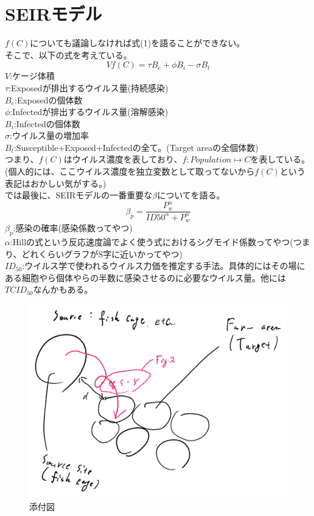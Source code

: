 \documentclass{article}
\begin{document}
\section{SEIRモデル}
$f(C)$についても議論しなければ式(1)を語ることができない。\\
そこで、以下の式を考えている。
\begin{equation}
    Vf(C) = \tau B_e + \phi B_i - \sigma B_t
\end{equation}
$V$:ケージ体積\\
$\tau$:Exposedが排出するウイルス量(持続感染)\\
$B_e$:Exposedの個体数\\
$\phi$:Infectedが排出するウイルス量(溶解感染)\\
$B_i$:Infectedの個体数\\
$\sigma$:ウイルス量の増加率\\
$B_t$:Susceptible+Exposed+Infectedの全て。(Target areaの全個体数)\\
つまり、$f(C)$はウイルス濃度を表しており、$f:Population\mapsto C$を表している。\\
(個人的には、ここウイルス濃度を独立変数として取ってないから$f(C)$という表記はおかしい気がする。)\\

では最後に、SEIRモデルの一番重要な$\beta$についてを語る。\\
\begin{equation}
    \beta _p = \frac{P^\alpha _w}{ID50^\alpha + P^\alpha _w}
\end{equation}
$\beta _p$:感染の確率(感染係数ってやつ)\\
$\alpha$:Hillの式という反応速度論でよく使う式におけるシグモイド係数ってやつ(つまり、どれくらいグラフがS字に近いかってやつ)\\
$ID_{50}$:ウイルス学で使われるウイルス力価を推定する手法。具体的にはその場にある細胞やら個体やらの半数に感染させるのに必要なウイルス量。他には$TCID_{50}$なんかもある。
\begin{figure}[htbp]
    \centering
    \includegraphics[width=\linewidth]{index_image1.png}
    \caption{添付図}
    \label{fig:enter-label}
\end{figure}
\end{document}
